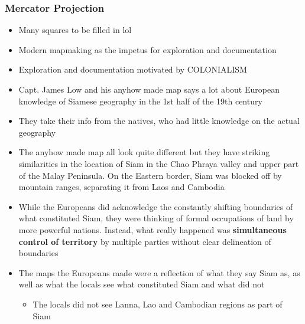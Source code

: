 \documentclass[a4paper]{article}
\begin{document}
\subsubsection{Mercator Projection}
\begin{itemize}
	\item Many squares to be filled in lol
	\item Modern mapmaking as the impetus for exploration and documentation
	\item Exploration and documentation motivated by COLONIALISM
	\item Capt. James Low and his anyhow made map says a lot about European knowledge of Siamese geography in the 1st half of the 19th century
	\item They take their info from the natives, who had little knowledge on the actual geography
	\item The anyhow made map all look quite different but they have striking similarities in the location of Siam in the Chao Phraya valley and upper part of the Malay Peninsula. On the Eastern border, Siam was blocked off by mountain ranges, separating it from Laos and Cambodia
	\item While the Europeans did acknowledge the constantly shifting boundaries of what constituted Siam, they were thinking of formal occupations of land by more powerful nations. Instead, what really happened was \textbf{simultaneous control of territory} by multiple parties without clear delineation of boundaries
	\item The maps the Europeans made were a reflection of what they say Siam as, as well as what the locals see what constituted Siam and what did not
	\begin{itemize}[label=$\circ$]
		\item The locals did not see Lanna, Lao and Cambodian regions as part of Siam
	\end{itemize}
\end{itemize}
\end{document}
